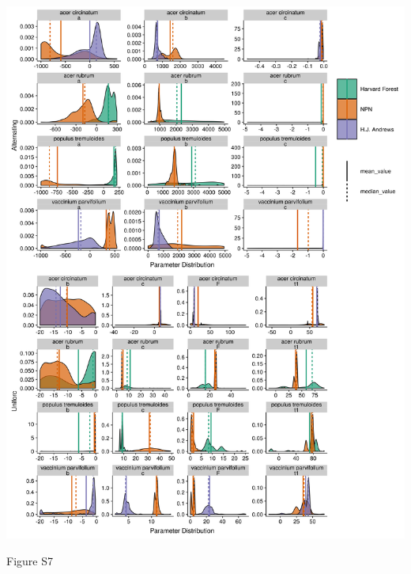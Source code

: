 \documentclass[a4paper,12pt]{article}
\begin{document}
\begin{center}
	\centering
		\includegraphics[scale=0.5]{supplement_select_species_param_comparison2.png}
	\caption{Figure S7}
\end{center}
\newpage
\end{document}
